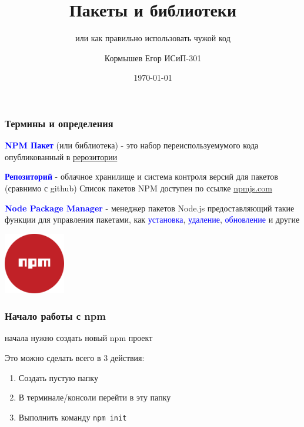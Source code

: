 \documentclass[aspectratio=169]{beamer}
\title{Пакеты и библиотеки}
\subtitle{или как правильно использовать чужой код}
\author{Кормышев Егор ИСиП-301}
\date{\today}
\begin{document}
\frame{\titlepage}


\begin{frame}
\frametitle{Термины и определения}


\textcolor{blue}{\textbf{NPM Пакет}} (или библиотека) -  это набор переиспользуемумого кода опубликованный в \underline{рерозитории}

\bigskip


\textcolor{blue}{\textbf{Репозиторий}} - облачное хранилище и система контроля версий для пакетов (сравнимо с github) 
Список пакетов NPM доступен по ссылке \underline{\href{https://www.npmjs.com/}{npmjs.com}}

\bigskip


\textcolor{blue}{\textbf{Node Package Manager}} - менеджер пакетов Node.js предоставляющий такие функции для управления пакетами, как \textcolor{blue}{установка}, \textcolor{blue}{удаление}, \textcolor{blue}{обновление} и другие

\bigskip
\begin{center}
\includegraphics[width=0.2\textwidth]{assets/npmicon.png}
\end{center}

\end{frame}


\begin{frame}
  \frametitle{Начало работы с npm}
  \begin{center}
     начала нужно создать новый npm проект 
  \end{center}
  
  \bigskip
  
  Это можно сделать всего в 3 действия:
  \begin{enumerate}
  \item Создать пустую папку
  \item В терминале/консоли перейти в эту папку
  \item Выполнить команду \texttt{npm init}
  \end{enumerate}
\end{frame}
\end{document}
